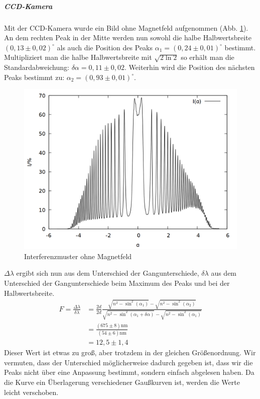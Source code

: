 \subparagraph{CCD-Kamera}
Mit der CCD-Kamera wurde ein Bild ohne Magnetfeld aufgenommen (Abb. \ref{fig:ohneb}).\\
An dem rechten Peak in der Mitte werden nun sowohl die halbe Halbwertsbreite $(0,13 \pm 0,02)^\circ$  als auch die Position des Peaks $\alpha_{1} = (0,24\pm 0,01)^\circ$ bestimmt. Multipliziert man die halbe Halbwertsbreite mit $\sqrt{2\ln 2}$ so erhält man die Standardabweichung: $\delta \alpha = 0,11 \pm 0,02$. Weiterhin wird die Position des nächsten Peaks bestimmt zu: $\alpha_2 = (0,93\pm 0,01)^\circ$.\\
\begin{figure}[h]
\centering
\includegraphics[scale=0.25]{data/zeeman/out_0_0_raw.png}
\caption{Interferenzmuster ohne Magnetfeld}
\label{fig:ohneb}
\end{figure}

$\Delta \lambda$ ergibt sich nun aus dem Unterschied der Gangunterschiede, $\delta \lambda$ aus dem Unterschied der Gangunterschiede beim Maximum des Peaks und bei der Halbwertsbreite.
\begin{align*}
F = \frac{\Delta \lambda}{\delta \lambda} &= \frac{2d}{2d}\frac{\sqrt{n^2-\sin^2(\alpha_1)}-\sqrt{n^2-\sin^2(\alpha_2)}}{\sqrt{n^2-\sin^2(\alpha_1+\delta \alpha)}-\sqrt{n^2-\sin^2(\alpha_1)}}\\
	&= \frac{(675 \pm 8) \si{\nano\meter}}{(54 \pm 6) \si{\nano\meter}}\\
	&=12,5 \pm 1,4
\end{align*}
Dieser Wert ist etwas zu groß, aber trotzdem in der gleichen Größenordnung. Wir vermuten, dass der Unterschied möglicherweise dadurch gegeben ist, dass wir die Peaks nicht über eine Anpassung bestimmt, sondern einfach abgelesen haben. Da die Kurve ein Überlagerung verschiedener Gaußkurven ist, werden die Werte leicht verschoben.

